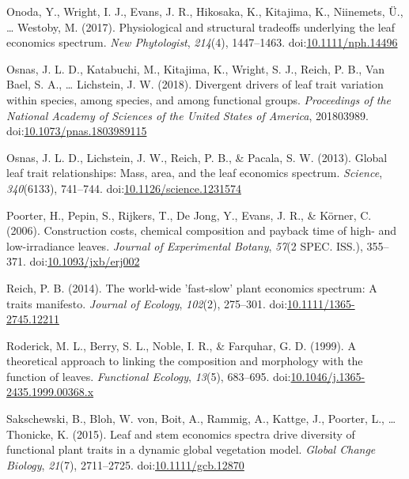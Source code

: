 \documentclass[12pt,]{article}
\theoremstyle{definition}
\theoremstyle{definition}
\theoremstyle{definition}
\theoremstyle{remark}
\begin{document}
\leavevmode\hypertarget{ref-Onoda2017}{}%
Onoda, Y., Wright, I. J., Evans, J. R., Hikosaka, K., Kitajima, K.,
Niinemets, Ü., \ldots{} Westoby, M. (2017). Physiological and structural
tradeoffs underlying the leaf economics spectrum. \emph{New
Phytologist}, \emph{214}(4), 1447--1463.
doi:\href{https://doi.org/10.1111/nph.14496}{10.1111/nph.14496}

\leavevmode\hypertarget{ref-Osnas2018}{}%
Osnas, J. L. D., Katabuchi, M., Kitajima, K., Wright, S. J., Reich, P.
B., Van Bael, S. A., \ldots{} Lichstein, J. W. (2018). Divergent drivers
of leaf trait variation within species, among species, and among
functional groups. \emph{Proceedings of the National Academy of Sciences
of the United States of America}, 201803989.
doi:\href{https://doi.org/10.1073/pnas.1803989115}{10.1073/pnas.1803989115}

\leavevmode\hypertarget{ref-Osnas2013}{}%
Osnas, J. L. D., Lichstein, J. W., Reich, P. B., \& Pacala, S. W.
(2013). Global leaf trait relationships: Mass, area, and the leaf
economics spectrum. \emph{Science}, \emph{340}(6133), 741--744.
doi:\href{https://doi.org/10.1126/science.1231574}{10.1126/science.1231574}

\leavevmode\hypertarget{ref-Poorter2006b}{}%
Poorter, H., Pepin, S., Rijkers, T., De Jong, Y., Evans, J. R., \&
Körner, C. (2006). Construction costs, chemical composition and payback
time of high- and low-irradiance leaves. \emph{Journal of Experimental
Botany}, \emph{57}(2 SPEC. ISS.), 355--371.
doi:\href{https://doi.org/10.1093/jxb/erj002}{10.1093/jxb/erj002}

\leavevmode\hypertarget{ref-Reich2014}{}%
Reich, P. B. (2014). The world-wide 'fast-slow' plant economics
spectrum: A traits manifesto. \emph{Journal of Ecology}, \emph{102}(2),
275--301.
doi:\href{https://doi.org/10.1111/1365-2745.12211}{10.1111/1365-2745.12211}

\leavevmode\hypertarget{ref-Roderick1999}{}%
Roderick, M. L., Berry, S. L., Noble, I. R., \& Farquhar, G. D. (1999).
A theoretical approach to linking the composition and morphology with
the function of leaves. \emph{Functional Ecology}, \emph{13}(5),
683--695.
doi:\href{https://doi.org/10.1046/j.1365-2435.1999.00368.x}{10.1046/j.1365-2435.1999.00368.x}

\leavevmode\hypertarget{ref-Sakschewski2015}{}%
Sakschewski, B., Bloh, W. von, Boit, A., Rammig, A., Kattge, J.,
Poorter, L., \ldots{} Thonicke, K. (2015). Leaf and stem economics
spectra drive diversity of functional plant traits in a dynamic global
vegetation model. \emph{Global Change Biology}, \emph{21}(7),
2711--2725.
doi:\href{https://doi.org/10.1111/gcb.12870}{10.1111/gcb.12870}
\end{document}
